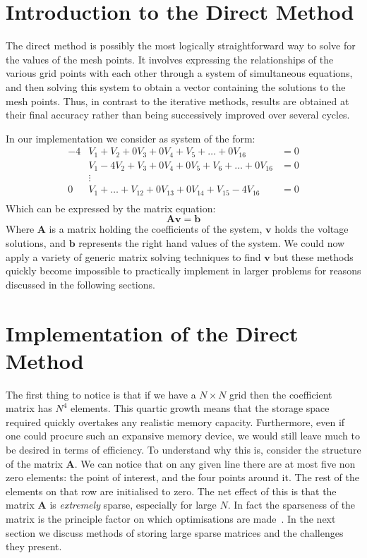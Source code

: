 \documentclass[a4paper]{article}
\newcommand{\mat}[1]{\mathbf{#1}}
\renewcommand{\vec}[1]{\bm{#1}}
\begin{document}
%

\section{Introduction to the Direct Method}
The direct method is possibly the most logically straightforward way to solve
for the values of the mesh points. It involves expressing the relationships of
the various grid points with each other through a system of simultaneous
equations, and then solving this system to obtain a vector containing the
solutions to the mesh points. Thus, in contrast to the iterative methods,
results are obtained at their final accuracy rather than being successively
improved over several cycles.

In our implementation we consider as system of the form:
\begin{align*}
	-4&V_1+V_2+0V_3+0V_4+V_5+\dots+0V_{16}&=0\\
	&V_1-4V_2+V_3+0V_4+0V_5+V_6+\dots+0V_{16}&=0\\
	&\vdots\\
	0&V_1+\dots+V_{12}+0V_{13}+0V_{14}+V_{15}-4V_{16}&=0\\
\end{align*}
Which can be expressed by the matrix equation:
\begin{equation*}
	\mat{A}\vec{v}=\vec{b}
\end{equation*}
Where $\mat{A}$ is a matrix holding the coefficients of the system, $\vec{v}$
holds the voltage solutions, and $\vec{b}$ represents the right hand values of
the system. We could now apply a variety of generic matrix solving techniques
to find $\vec{v}$ but these methods quickly become impossible to practically
implement in larger problems for reasons discussed in the following sections.

\section{Implementation of the Direct Method}
The first thing to notice is that if we have a $N\times N$ grid then the
coefficient matrix has $N^4$ elements. This quartic growth means that the
storage space required quickly overtakes any realistic memory capacity.
Furthermore, even if one could procure such an expansive memory device, we
would still leave much to be desired in terms of efficiency. To understand why
this is, consider the structure of the matrix $\mat{A}$. We can notice that on
any given line there are at most five non zero elements: the point of interest,
and the four points around it. The rest of the elements on that row are
initialised to zero. The net effect of this is that the matrix $\mat{A}$ is
\emph{extremely} sparse, especially for large $N$. In fact the sparseness of
the matrix is the principle factor on which optimisations are made~\cite{NR}.
In the next section we discuss methods of storing large sparse matrices and the
challenges they present.
\end{document}
